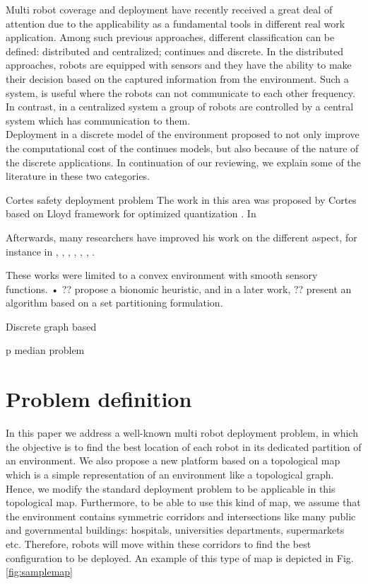\documentclass[letterpaper, 10 pt, conference]{ieeeconf}  %
\begin{document}
Multi robot coverage and deployment have recently received a great deal of attention due to the applicability as a fundamental tools in different real work application.
%
Among such previous approaches, different classification can be defined: distributed and centralized; continues and discrete.
%
In the distributed approaches, robots are equipped with sensors and they have the ability to make their decision based on the captured information from the environment. Such a system, is useful where the robots can not communicate to each other frequency.
%
In contrast, in a centralized system a group of robots are controlled by a central system which has communication to them.
%
\\
Deployment in a discrete model of the environment proposed to not only improve the computational cost of the continues models, but also because of the nature of the discrete applications. In continuation of our reviewing, we explain some of the literature in these two categories.
%

Cortes \cite{Cortes2004}
%
safety \cite{reza2014}
%
\cite{Stergi2011}
%
deployment problem
%
The  work in this area was proposed by Cortes \cite{Cortes2004} based on Lloyd framework for optimized quantization \cite{Lloyd1982}. In 

Afterwards, many researchers have improved his work on the different aspect, for instance in \cite{Pimenta2008}, \cite{Breitenmoser2010}, \cite{Stergi2011}, \cite{Tzes2010}, \cite{Mahboubi2012}, \cite{Yun2013}, \cite{Durham2012}. \cite{Bhattacharya2013a}

These works were limited to a convex environment with smooth sensory functions.
•	?? propose a bionomic heuristic, and in a later work, ?? present an algorithm based on a set partitioning formulation.

%
Discrete 
%
graph based
\cite{Yun2013}

p median problem 

\section{Problem definition}

In this paper we address a well-known multi robot deployment problem, in which the objective is to find the best location of each robot in its dedicated partition of an environment. We also propose a new platform based on a topological map which is a simple representation of an environment like a topological graph. Hence, we modify the standard deployment problem to be applicable in this topological map. Furthermore, to be able to use this kind of map, we assume that the environment contains symmetric corridors and intersections like many public and governmental buildings: hospitals, universities departments, supermarkets etc. Therefore, robots will move within these corridors to find the best configuration to be deployed. An example of this type of map is depicted in Fig. \ref{fig:samplemap}
\end{document}
